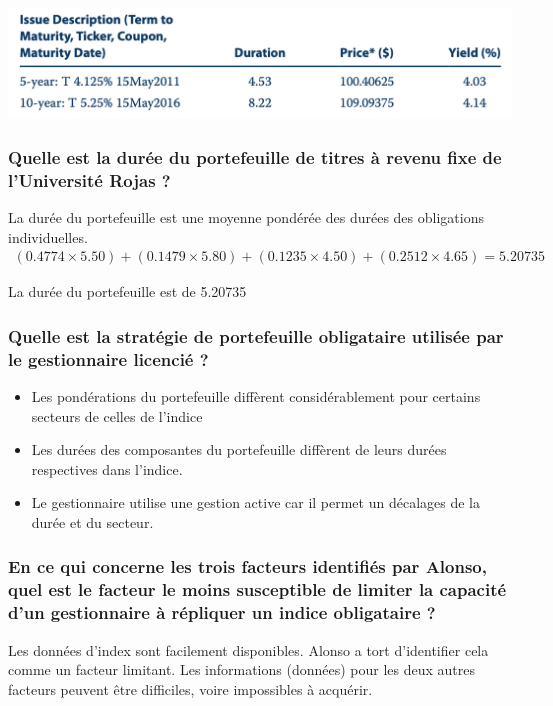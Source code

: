 \documentclass[12pt]{article}
\begin{document}
\begin{itemize}
\includegraphics[width=14cm]{14}

\vspace{0.5cm}

\subsubsection*{Quelle est la durée du portefeuille de titres à revenu fixe de l'Université Rojas ?}
La durée du portefeuille est une moyenne pondérée des durées des obligations individuelles.
\begin{align*}
(0.4774 \times 5.50) + (0.1479 \times 5.80) + (0.1235 \times 4.50)+ (0.2512 \times 4.65) = 5.20735
\end{align*}

La durée du portefeuille est de 5.20735

\subsubsection*{Quelle est la stratégie de portefeuille obligataire utilisée par le gestionnaire licencié ?}
\begin{itemize}
\item Les pondérations du portefeuille diffèrent considérablement pour certains secteurs de celles de l'indice
\item Les durées des composantes du portefeuille diffèrent de leurs durées respectives dans l'indice.
\item Le gestionnaire utilise une gestion active car il permet un décalages de la durée et du secteur.
\end{itemize}

\subsubsection*{En ce qui concerne les trois facteurs identifiés par Alonso, quel est le facteur le moins susceptible de limiter la capacité d’un gestionnaire à répliquer un indice obligataire ?}
 Les données d'index sont facilement disponibles. Alonso a tort d'identifier cela comme un facteur limitant. Les informations (données) pour les deux autres facteurs peuvent être difficiles, voire impossibles à acquérir.

\end{itemize}
\end{document}
